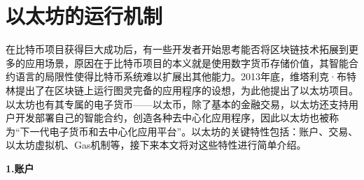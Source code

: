 \section{以太坊的运行机制}
\label{sec:以太坊的运行机制}

在比特币项目获得巨大成功后，有一些开发者开始思考能否将区块链技术拓展到更多的应用场景，原因在于比特币项目的本义就是使用数字货币存储价值，其智能合约语言的局限性使得比特币系统难以扩展出其他能力。2013年底，维塔利克·布特林提出了在区块链上运行图灵完备的应用程序的设想，为此他提出了以太坊项目。以太坊也有其专属的电子货币——以太币，除了基本的金融交易，以太坊还支持用户开发部署自己的智能合约，创造各种去中心化应用程序，因此以太坊也被称为“下一代电子货币和去中心化应用平台”。以太坊的关键特性包括：账户、交易、以太坊虚拟机、Gas机制等，接下来本文将对这些特性进行简单介绍。



\par\textbf{1.账户}


